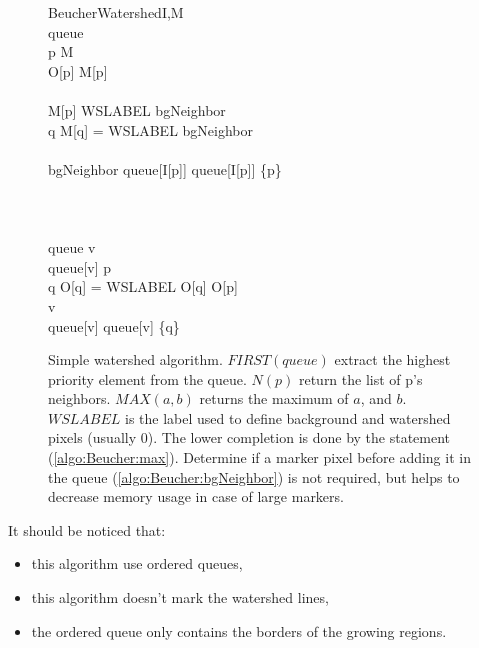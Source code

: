 \documentclass{InsightArticle}
\begin{document}
\begin{figure}[htbp]
\centering
\small
\begin{pseudocode}[framebox]{BeucherWatershed}{I,M}
 \\
queue \GETS \emptyset \\
\FOREACH p \in M \DO
\BEGIN
  \\
  O[p] \GETS M[p] \\
  \\
  \IF M[p] \neq WSLABEL
  \THEN
  \BEGIN
    bgNeighbor \GETS \FALSE \\
    \FOREACH q \in {} \DO 
    \BEGIN
      \IF M[q] = WSLABEL
        \THEN bgNeighbor \GETS \TRUE \\
    \END\\
    \IF bgNeighbor 
      \THEN
      queue[I[p]] \GETS queue[I[p]] \cup \{p\} \\
  \END
\END
\\
\\
 \\
\WHILE queue \neq \emptyset \DO
\BEGIN
  v \GETS {}\\
  \WHILE queue[v] \neq \emptyset \DO
  \BEGIN
    p \GETS {} \\
    \FOREACH q \in {} \DO
    \BEGIN
    \IF O[q] = WSLABEL
    \THEN
    \BEGIN
      O[q] \GETS O[p] \\
      v \GETS {}  \\
      queue[v] \GETS queue[v] \cup \{q\} \\
    \END
    \END
  \END
\END
\end{pseudocode}
\caption{Simple watershed algorithm.\label{BeucherAlgorithm} $FIRST(queue)$ extract the highest priority element from the queue. $N(p)$ return the list of p's neighbors. $MAX(a,b)$ returns the maximum of $a$, and $b$. $WSLABEL$ is the label used to define background and watershed pixels (usually $0$). The lower completion is done by the statement (\ref{algo:Beucher:max}). Determine if a marker pixel before adding it in the queue (\ref{algo:Beucher:bgNeighbor}) is not required, but helps to decrease memory usage in case of large markers.}
\end{figure}

It should be noticed that:
\begin{itemize}
  \item this algorithm use ordered queues,
  \item this algorithm doesn't mark the watershed lines,
  \item the ordered queue only contains the borders of the growing regions.
\end{itemize}
\end{document}
